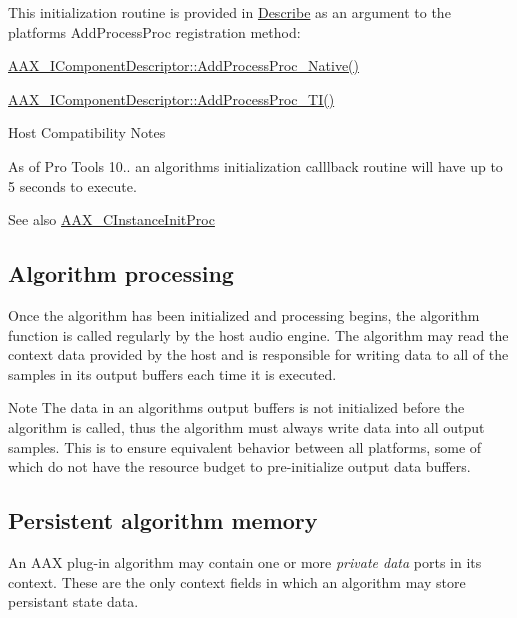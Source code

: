  This initialization routine is provided in \mbox{\hyperlink{a00796}{Describe}} as an argument to the platform\textquotesingle{}s {\ttfamily Add\+Process\+Proc} registration method\+:

 \begin{DoxyItemize}
\item \mbox{\hyperlink{a01781_a1c069508cf54a523905c8160ebf628ad}{A\+A\+X\+\_\+\+I\+Component\+Descriptor\+::\+Add\+Process\+Proc\+\_\+\+Native()}} \item \mbox{\hyperlink{a01781_a38f7fb30a378a17ce9635f5c36100a3b}{A\+A\+X\+\_\+\+I\+Component\+Descriptor\+::\+Add\+Process\+Proc\+\_\+\+T\+I()}}\end{DoxyItemize}
\begin{DoxyRefDesc}{Host Compatibility Notes}
\item[\mbox{\hyperlink{a00786__compatibility_notes000002}{Host Compatibility Notes}}]As of Pro Tools 10.. an algorithm\textquotesingle{}s initialization calllback routine will have up to 5 seconds to execute.\end{DoxyRefDesc}


 \begin{DoxySeeAlso}{See also}
\mbox{\hyperlink{a00401_a3963a850079d3186e08c97a1a4d0ef1c}{A\+A\+X\+\_\+\+C\+Instance\+Init\+Proc}}
\end{DoxySeeAlso}


 \hypertarget{a00797_alg_processing}{}\subsection{Algorithm processing}\label{a00797_alg_processing}
 Once the algorithm has been initialized and processing begins, the algorithm function is called regularly by the host audio engine. The algorithm may read the context data provided by the host and is responsible for writing data to all of the samples in its output buffers each time it is executed.

 \begin{DoxyNote}{Note}
The data in an algorithm\textquotesingle{}s output buffers is not initialized before the algorithm is called, thus the algorithm must always write data into all output samples. This is to ensure equivalent behavior between all platforms, some of which do not have the resource budget to pre-\/initialize output data buffers.
\end{DoxyNote}


 \hypertarget{a00797_alg_pd}{}\subsection{Persistent algorithm memory}\label{a00797_alg_pd}
 An A\+AX plug-\/in algorithm may contain one or more {\itshape private data} ports in its context. These are the only context fields in which an algorithm may store persistant state data.

